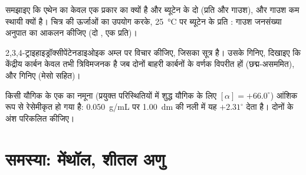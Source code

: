 \begin{exercise}[$\star\star\star$]\label{exo:b1:stereochemistry-in-depth:10}
समझाइए कि एथेन का केवल एक प्रकार का  क्यों है और
ब्यूटेन के दो (प्रति और गाउश), और गाउश कम स्थायी क्यों है। चित्र की
ऊर्जाओं का उपयोग करके, \qty{25}{\celsius} पर ब्यूटेन के प्रति : गाउश जनसंख्या
अनुपात का आकलन कीजिए (दो , एक प्रति)।
\end{exercise}

\begin{exercise}[$\star\star\star$]\label{exo:b1:stereochemistry-in-depth:11}
2,3,4-ट्राइहाइड्रॉक्सीपेंटेनडाइओइक अम्ल पर विचार कीजिए, जिसका सूत्र
 है। उसके  गिनिए, दिखाइए
कि केंद्रीय कार्बन केवल तभी त्रिविमजनक है जब दोनों बाहरी कार्बनों के
वर्णक विपरीत हों (छद्म-असममित), और  गिनिए
(मेसो सहित)।
\end{exercise}

\begin{exercise}[$\star\star\star$]\label{exo:b1:stereochemistry-in-depth:12}
किसी यौगिक के एक  का नमूना (प्रयुक्त परिस्थितियों में शुद्ध यौगिक के लिए
$[\alpha] = +66.0^\circ$) आंशिक रूप से रेसेमीकृत हो गया है:
\qty{0.050}{g/mL} पर \qty{1.00}{dm} की नली में यह $+2.31^\circ$ देता है।
दोनों  के अंश परिकलित कीजिए।
\end{exercise}
\clearpage\enlargethispage{3\baselineskip}
\section{समस्या: मेंथॉल, शीतल अणु}

